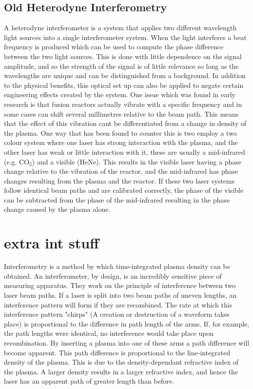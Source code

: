 \documentclass[12pt,a4paper,oneside]{report}
\begin{document}
    \subsection{Old Heterodyne Interferometry}
A heterodyne interferometer is a system that applies two different wavelength light sources into a single interferometer system. When the light interferes a beat frequency is produced which can be used to compute the phase difference between the two light sources. This is done with little dependence on the signal amplitude, and so the strength of the signal is of little relevance so long as the wavelengths are unique and can be distinguished from a background. In addition to the physical benefits, this optical set up can also be applied to negate certain engineering effects created by the system. One issue which was found in early research is that fusion reactors actually vibrate with a specific frequency and in some cases can shift several millimetres relative to the beam path. This means that the effect of this vibration cant be differentiated from a change in density of the plasma. One way that has been found to counter this is two employ a two colour system where one laser has strong interaction with the plasma, and the other laser has weak or little interaction with it, these are usually a mid-infrared (e.g. CO$_{2}$) and a visible (HeNe). This results in the visible laser having a phase change relative to the vibration of the reactor, and the mid-infrared has phase changes resulting from the plasma and the reactor. If these two laser systems follow identical beam paths and are calibrated correctly, the phase of the visible can be subtracted from the phase of the mid-infrared resulting in the phase change caused by the plasma alone.\\

\section{extra int stuff}
Interferometry is a method by which time-integrated plasma density can be obtained. An interferometer, by design, is an incredibly sensitive piece of measuring apparatus. They work on the principle of interference between two laser beam paths. If a laser is split into two beam paths of uneven lengths, an interference pattern will form if they are recombined. The rate at which this interference pattern "chirps" (A creation or destruction of a waveform takes place) is proportional to the difference in path length of the arms. If, for example, the path lengths were identical, no interference would take place upon recombination. By inserting a plasma into one of these arms a path difference will become apparent. This path difference is proportional to the line-integrated density of the plasma. This is due to the density-dependant refractive index of the plasma. A larger density results in a larger refractive index, and hence the laser has an apparent path of greater length than before.
\end{document}

